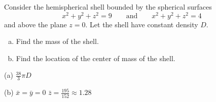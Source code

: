 \begin{question}[M200 2008A] %
Consider the hemispherical shell bounded by the spherical surfaces
\begin{equation*}
x^2 + y^2 + z^2 = 9\qquad\text{and}\qquad
x^2 + y^2 + z^2 = 4
\end{equation*}
and above the plane $z = 0$. Let the shell have constant density $D$. 
\begin{enumerate}[(a)]
\item
Find the mass of the shell.

\item
Find the location of the center of mass of the shell.
\end{enumerate}
\end{question}

%

\begin{answer}
(a) $\frac{38}{3}\pi D$

(b)
$\bar x = \bar y=0$\qquad
$\bar z =\frac{195}{152} \approx 1.28$
\end{answer}

